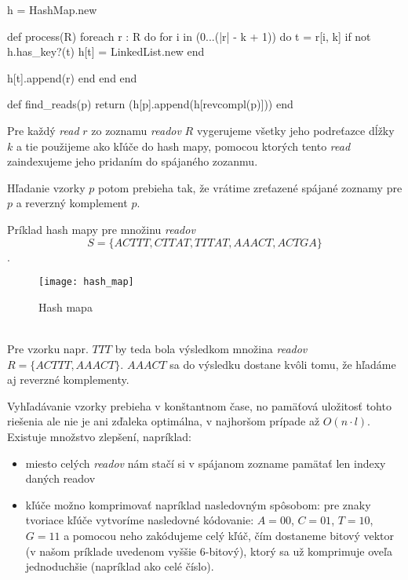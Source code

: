 \bigskip
\begin{pseudocode}[label=lst:hash_algorithm,caption={Algoritmus na riešenie
problému zarovnania readov pomocou hash mapy}]
h = HashMap.new

def process(R)
  foreach r : R do
    for i in (0...(|r| - k + 1)) do
      t = r[i, k]
      if not h.has_key?(t)
        h[t] = LinkedList.new
      end
        
      h[t].append(r)
    end 
  end
end

def find_reads(p)
  return (h[p].append(h[revcompl(p)]))
end
\end{pseudocode}
\bigskip

Pre každý \emph{read} $r$ zo zoznamu \emph{readov} $R$ vygerujeme všetky jeho
podreťazce dĺžky $k$ a tie použijeme ako kľúče do hash mapy, pomocou ktorých
tento \emph{read} zaindexujeme jeho pridaním do spájaného zozanmu.

Hľadanie vzorky $p$ potom prebieha tak, že vrátime zreťazené spájané
zoznamy pre $p$ a reverzný komplement $p$.

\begin{example}
    Príklad hash mapy pre množinu \emph{readov} $$S = \{ACTTT, CTTAT, TTTAT,
    AAACT, ACTGA\}$$.
    \begin{figure}[h]
        \centering
        \texttt{[image: hash\_map]}
        \caption{Hash mapa}
        \label{fig:hash_map}
    \end{figure}
    \\
    Pre vzorku napr. $TTT$ by teda bola výsledkom množina \emph{readov} $R =
    \{ACTTT, AAACT\}$. $AAACT$ sa do výsledku dostane kvôli tomu, že hľadáme aj reverzné komplementy.
\end{example}

Vyhľadávanie vzorky prebieha v konštantnom čase, no pamäťová uložitosť tohto
riešenia ale nie je ani zďaleka optimálna, v najhoršom prípade až $O(n \cdot
l)$. Existuje množstvo zlepšení, napríklad:

\begin{itemize}
    \item miesto celých \emph{readov} nám stačí si v spájanom zozname
    pamätať len indexy daných readov
    \item kľúče možno komprimovať napríklad nasledovným spôsobom: pre znaky
    tvoriace kľúče vytvoríme nasledovné kódovanie: $A = 00$, $C = 01$, $T = 10$,
    $G = 11$ a pomocou neho zakódujeme celý kľúč, čím dostaneme bitový vektor
    (v našom príklade uvedenom vyššie 6-bitový), ktorý sa už komprimuje oveľa
    jednoduchšie (napríklad ako celé číslo).
\end{itemize}

